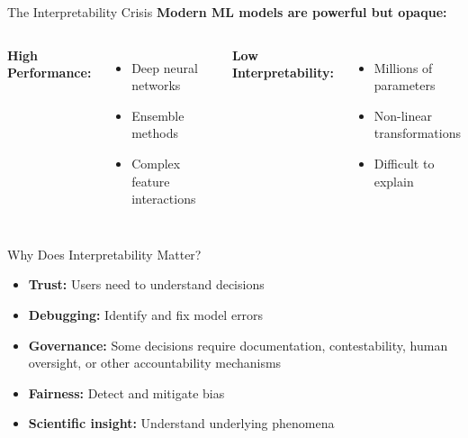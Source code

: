 \documentclass[aspectratio=169]{beamer}
\begin{document}
\begin{frame}{The Interpretability Crisis}
  \textbf{Modern ML models are powerful but opaque:}

  \begin{columns}
    \textbf{High Performance:}
    \begin{itemize}
      \item Deep neural networks
      \item Ensemble methods
      \item Complex feature interactions
    \end{itemize}

    \textbf{Low Interpretability:}
    \begin{itemize}
      \item Millions of parameters
      \item Non-linear transformations
      \item Difficult to explain
    \end{itemize}
  \end{columns}

  \vspace{1em}

  \begin{alertbox}{Why Does Interpretability Matter?}
    \begin{itemize}
      \item \textbf{Trust:} Users need to understand decisions
      \item \textbf{Debugging:} Identify and fix model errors
      \item \textbf{Governance:} Some decisions require documentation, contestability, human oversight, or other accountability mechanisms
      \item \textbf{Fairness:} Detect and mitigate bias
      \item \textbf{Scientific insight:} Understand underlying phenomena
    \end{itemize}
  \end{alertbox}
\end{frame}
\end{document}
